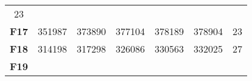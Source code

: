 \documentclass[12pt,a4paper]{article}
\begin{document}
\begin{longtable}[c]{@{}crrrrrr@{}}
\begin{minipage}[t]{0.07\columnwidth}
23
\strut\end{minipage}\tabularnewline
\begin{minipage}[t]{0.11\columnwidth}\centering\strut
\textbf{F17}
\strut\end{minipage} &
\begin{minipage}[t]{0.08\columnwidth}\raggedleft\strut
351987
\strut\end{minipage} &
\begin{minipage}[t]{0.08\columnwidth}\raggedleft\strut
373890
\strut\end{minipage} &
\begin{minipage}[t]{0.09\columnwidth}\raggedleft\strut
377104
\strut\end{minipage} &
\begin{minipage}[t]{0.10\columnwidth}\raggedleft\strut
378189
\strut\end{minipage} &
\begin{minipage}[t]{0.11\columnwidth}\raggedleft\strut
378904
\strut\end{minipage} &
\begin{minipage}[t]{0.07\columnwidth}\raggedleft\strut
23
\strut\end{minipage}\tabularnewline
\begin{minipage}[t]{0.11\columnwidth}\centering\strut
\textbf{F18}
\strut\end{minipage} &
\begin{minipage}[t]{0.08\columnwidth}\raggedleft\strut
314198
\strut\end{minipage} &
\begin{minipage}[t]{0.08\columnwidth}\raggedleft\strut
317298
\strut\end{minipage} &
\begin{minipage}[t]{0.09\columnwidth}\raggedleft\strut
326086
\strut\end{minipage} &
\begin{minipage}[t]{0.10\columnwidth}\raggedleft\strut
330563
\strut\end{minipage} &
\begin{minipage}[t]{0.11\columnwidth}\raggedleft\strut
332025
\strut\end{minipage} &
\begin{minipage}[t]{0.07\columnwidth}\raggedleft\strut
27
\strut\end{minipage}\tabularnewline
\begin{minipage}[t]{0.11\columnwidth}\centering\strut
\textbf{F19}
\strut\end{minipage} &
\begin{minipage}[t]{0.08\columnwidth}\raggedleft\strut

\end{minipage}
\end{longtable}
\end{document}
